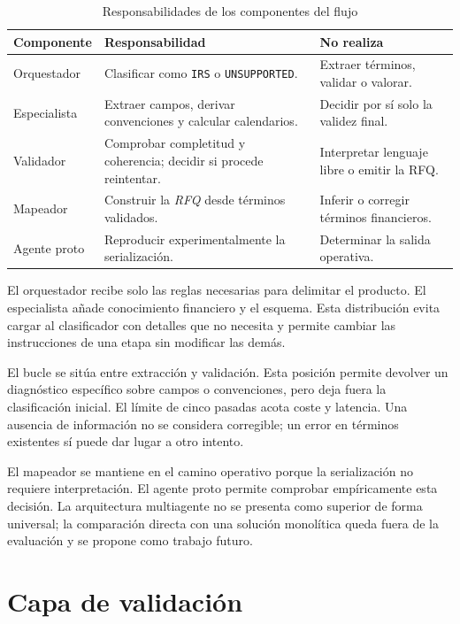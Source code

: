 \begin{table}[H]
\centering
\small
\caption{Responsabilidades de los componentes del flujo}
\label{tab:responsabilidades_componentes}
\begin{tabular}{|P{3.0cm}|P{4.8cm}|P{5.0cm}|}
\hline
\textbf{Componente} & \textbf{Responsabilidad} & \textbf{No realiza} \\
\hline
Orquestador & Clasificar como \texttt{IRS} o \texttt{UNSUPPORTED}. & Extraer términos, validar o valorar. \\
\hline
Especialista & Extraer campos, derivar convenciones y calcular calendarios. & Decidir por sí solo la validez final. \\
\hline
Validador & Comprobar completitud y coherencia; decidir si procede reintentar. & Interpretar lenguaje libre o emitir la RFQ. \\
\hline
Mapeador & Construir la \textit{RFQ} desde términos validados. & Inferir o corregir términos financieros. \\
\hline
Agente proto & Reproducir experimentalmente la serialización. & Determinar la salida operativa. \\
\hline
\end{tabular}
\end{table}

El orquestador recibe solo las reglas necesarias para delimitar el producto. El especialista añade conocimiento financiero y el esquema. Esta distribución evita cargar al clasificador con detalles que no necesita y permite cambiar las instrucciones de una etapa sin modificar las demás.

El bucle se sitúa entre extracción y validación. Esta posición permite devolver un diagnóstico específico sobre campos o convenciones, pero deja fuera la clasificación inicial. El límite de cinco pasadas acota coste y latencia. Una ausencia de información no se considera corregible; un error en términos existentes sí puede dar lugar a otro intento.

El mapeador se mantiene en el camino operativo porque la serialización no requiere interpretación. El agente proto permite comprobar empíricamente esta decisión. La arquitectura multiagente no se presenta como superior de forma universal; la comparación directa con una solución monolítica queda fuera de la evaluación y se propone como trabajo futuro.

\section{Capa de validación}
\label{sec:capa_validacion}

